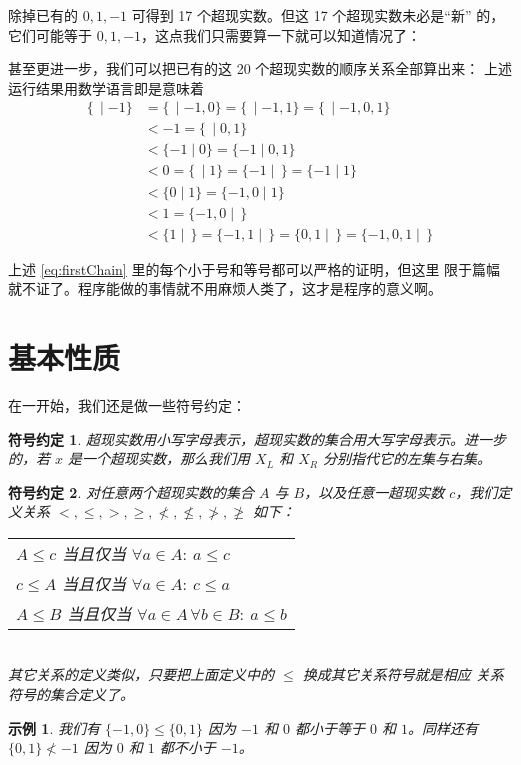 \documentclass[cs4size,a4paper,adobefonts]{ctexart}
\newtheorem*{symbolDef}{符号约定}
\newtheorem*{forExample}{示例}
\numberwithin{equation}{section}
\begin{document}
除掉已有的 $0,1,-1$ 可得到 17 个超现实数。但这 17 个超现实数未必是“新”
的，它们可能等于 $0,1,-1$，这点我们只需要算一下就可以知道情况了：

甚至更进一步，我们可以把已有的这 20 个超现实数的顺序关系全部算出来：
上述运行结果用数学语言即是意味着
\begin{equation}
  \label{eq:firstChain}
  \begin{split}
    \{\,\mid-1\} &=\{\,\mid-1,0\}=\{\,\mid-1,1\}=\{\,\mid-1,0,1\} \\
    &< -1 =\{\,\mid0,1\}\\
    &< \{-1\mid0\}=\{-1\mid0,1\}\\
    &< 0=\{\,\mid1\}=\{-1\mid\,\}=\{-1\mid1\}\\
    &< \{0\mid1\}=\{-1,0\mid1\}\\
    &< 1=\{-1,0\mid\,\}\\
    &< \{1\mid\,\}=\{-1,1\mid\,\}=\{0,1\mid\,\}=\{-1,0,1\mid\,\}
  \end{split}
\end{equation}

上述 \eqref{eq:firstChain} 里的每个小于号和等号都可以严格的证明，但这里
限于篇幅就不证了。程序能做的事情就不用麻烦人类了，这才是程序的意义啊。

\section{基本性质}

在一开始，我们还是做一些符号约定：
\begin{symbolDef}
  超现实数用小写字母表示，超现实数的集合用大写字母表示。进一步的，若
  $x$ 是一个超现实数，那么我们用 $X_L$ 和 $X_R$ 分别指代它的左集与右集。
\end{symbolDef}
\begin{symbolDef}
  对任意两个超现实数的集合 $A$ 与 $B$，以及任意一超现实数 $c$，我们定义关系
  $<,\leq,>,\geq,\nless,\nleq,\ngtr,\ngeq$ 如下：
  
  \begin{tabular}{l}
    $A\leq c$ 当且仅当 $\forall a \in A:\: a \leq c$\\
    $c\leq A$ 当且仅当 $\forall a \in A:\: c \leq a$\\
    $A\leq B$ 当且仅当 $\forall a \in A\, \forall b \in B:\: a\leq b$\\
  \end{tabular}\\
其它关系的定义类似，只要把上面定义中的 $\leq$ 换成其它关系符号就是相应
关系符号的集合定义了。
\end{symbolDef}
\begin{forExample}
  我们有 $\{-1,0\} \leq \{0,1\}$ 因为 $-1$ 和 $0$ 都小于等于 $0$ 和
  $1$。同样还有 $\{0,1\} \nless -1$ 因为 $0$ 和 $1$ 都不小于 $-1$。
\end{forExample}
\end{document}
